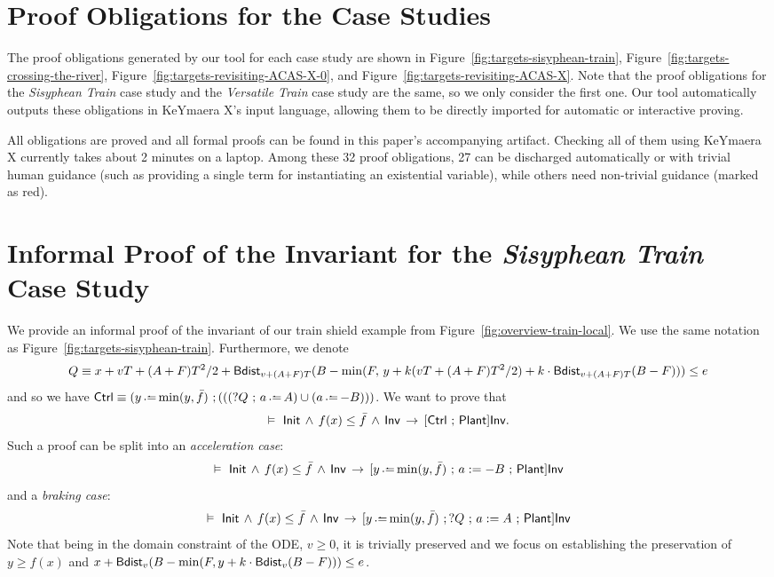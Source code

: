 \section{Proof Obligations for the Case Studies}
\label{ap:proof-obligations}
The proof obligations generated by our tool for each case study are shown in Figure~\ref{fig:targets-sisyphean-train}, Figure~\ref{fig:targets-crossing-the-river}, Figure~\ref{fig:targets-revisiting-ACAS-X-0}, and Figure~\ref{fig:targets-revisiting-ACAS-X}. Note that the proof obligations for the \emph{Sisyphean Train} case study and the \emph{Versatile Train} case study are the same, so we only consider the first one. Our tool automatically outputs these obligations in KeYmaera X's input language, allowing them to be directly imported for automatic or interactive proving.

All obligations are proved and all formal proofs can be found in this paper's accompanying artifact. Checking all of them using KeYmaera X currently takes about 2 minutes on a laptop. Among these 32 proof obligations, 27 can be discharged automatically or with trivial human guidance (such as providing a single term for instantiating an existential variable), while others need non-trivial guidance (marked as red).





\clearpage

\section{Informal Proof of the Invariant for the \emph{Sisyphean Train} Case Study}\label{ap:train-invariant-proof}
We provide an informal proof of the invariant of our train shield example from Figure~\ref{fig:overview-train-local}. We use the same notation as Figure~\ref{fig:targets-sisyphean-train}. Furthermore, we denote
{\small\[Q \equiv x + vT + (A + F)T^2/2 + \textsf{Bdist}_{v+(A+F)T}(B - \min(F, \, y + k(vT + (A + F)T^2/2) + k \cdot \textsf{Bdist}_{v + (A+F)T}(B-F))) \le e\]} and so we have $\Ctrl \equiv (y \dlassign \min(y, \TrainFxMax) \seq (((?Q \seq a \dlassign A) \cup (a \dlassign -B)))$. We want to prove that \[\vDash \ \mathsf{Init} \, \land \, f(x) \le \bar {f} \, \land \, \mathsf{Inv} \,\rightarrow\, [\mathsf{Ctrl} \operatorname*{\,;\,} \mathsf{Plant}] \mathsf{Inv}.\] Such a proof can be split into an \emph{acceleration case}: \[\vDash \ \Init \, \land \, f(x) \le \TrainFxMax \, \land \, \Inv \limply [y \dlassign \min(y, \TrainFxMax) \seq a:=-B \seq \Plant] \Inv\] and a \emph{braking case}: \[\vDash \ \Init \, \land \, f(x) \le \TrainFxMax \, \land \, \Inv \limply [y \dlassign \min(y, \TrainFxMax) \seq ?Q \seq a:=A \seq \Plant] \Inv\] Note that being in the domain constraint of the ODE, $v \ge 0$, it is trivially preserved and we focus on establishing the preservation of $y \ge f(x)$ and $x + \textsf{Bdist}_{v}(B - \min(F, y + k \cdot \textsf{Bdist}_{v}(B-F))) \le e$.

